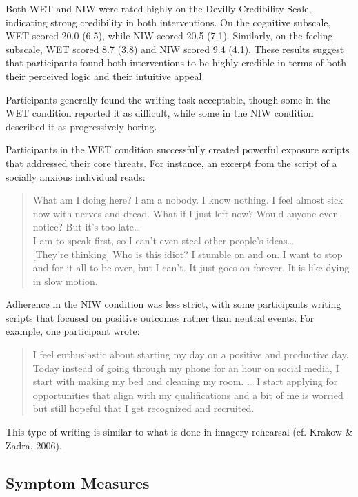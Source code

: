 \documentclass[
  man,floatsintext]{apa7}
\begin{document}
Both WET and NIW were rated highly on the Devilly Credibility Scale, indicating strong credibility in both interventions.
On the cognitive subscale, WET scored 20.0 (6.5), while NIW scored 20.5 (7.1).
Similarly, on the feeling subscale, WET scored 8.7 (3.8) and NIW scored 9.4 (4.1).
These results suggest that participants found both interventions to be highly credible in terms of both their perceived logic and their intuitive appeal.

Participants generally found the writing task acceptable, though some in the WET condition reported it as difficult, while some in the NIW condition described it as progressively boring.

Participants in the WET condition successfully created powerful exposure scripts that addressed their core threats.
For instance, an excerpt from the script of a socially anxious individual reads:

\begin{quote}
What am I doing here? I am a nobody. I know nothing. I feel almost sick now with nerves and dread. What if I just left now? Would anyone even notice? But it's too late\ldots{}\\
I am to speak first, so I can't even steal other people's ideas\ldots{}\\
{[}They're thinking{]} Who is this idiot? I stumble on and on. I want to stop and for it all to be over, but I can't. It just goes on forever. It is like dying in slow motion.
\end{quote}

Adherence in the NIW condition was less strict, with some participants writing scripts that focused on positive outcomes rather than neutral events.
For example, one participant wrote:

\begin{quote}
I feel enthusiastic about starting my day on a positive and productive day.
Today instead of going through my phone for an hour on social media, I start with making my bed and cleaning my room.
\ldots{} I start applying for opportunities that align with my qualifications and a bit of me is worried but still hopeful that I get recognized and recruited.
\end{quote}

This type of writing is similar to what is done in imagery rehearsal (cf. Krakow \& Zadra, 2006).

\subsection{Symptom Measures}\label{symptom-measures}
\end{document}
